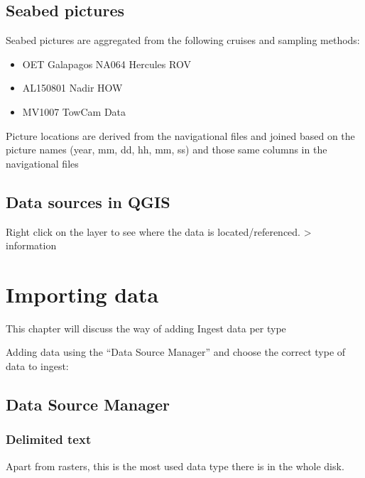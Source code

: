 \documentclass[letterpaper,10pt,english]{sphinxmanual}
\begin{document}
\section{Seabed pictures}
\label{\detokenize{02_folder_hierarchy:seabed-pictures}}
\sphinxAtStartPar
Seabed pictures are aggregated from the following cruises and sampling methods:
\begin{itemize}
\item {} 
\sphinxAtStartPar
OET Galapagos \sphinxhyphen{}NA064 Hercules ROV

\item {} 
\sphinxAtStartPar
AL150801 \sphinxhyphen{} Nadir HOW

\item {} 
\sphinxAtStartPar
MV1007 \sphinxhyphen{} TowCam Data

\end{itemize}

\sphinxAtStartPar
Picture locations are derived from the navigational files and joined based on the picture names (year, mm, dd, hh, mm, ss) and those same columns in the navigational files


\section{Data sources in QGIS}
\label{\detokenize{02_folder_hierarchy:data-sources-in-qgis}}
\sphinxAtStartPar
Right click on the layer to see where the data is located/referenced. \sphinxhyphen{}\textgreater{} information


\chapter{Importing data}
\label{\detokenize{03_data_ingest:importing-data}}\label{\detokenize{03_data_ingest::doc}}
\sphinxAtStartPar
This chapter will discuss the way of adding Ingest data per type

\sphinxAtStartPar
Adding data using the “Data Source Manager” and choose the correct type of data to ingest:


\section{Data Source Manager}
\label{\detokenize{03_data_ingest:data-source-manager}}

\subsection{Delimited text}
\label{\detokenize{03_data_ingest:delimited-text}}
\sphinxAtStartPar
Apart from rasters, this is the most used data type there is in the whole disk.
\end{document}
